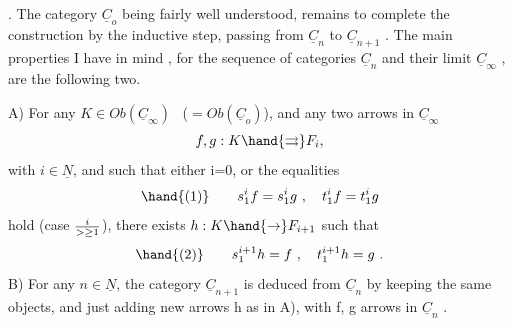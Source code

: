 . The category $\underline{C}_o$ being fairly well understood,  remains to complete
the construction by the inductive step,  passing from $\underline{C}_n$ to $\underline{C}_{n+1}$ . The
main properties I have in mind  , for the sequence of categories
$\underline{C}_n$ and their limit $\underline{C}_\infty$ , are the following two.

A) For any $K\in Ob(\underline{C}_\infty)$ \ ($= Ob(\underline{C}_o)$), and any two arrows in $\underline{C}_\infty$
\[ f,g : K \hand{\rightrightarrows} F_i , \]
with $i\in\underline{N}$, \hand{(}and such that either i=0, or the equalities
\[ \hand{(1)}\qquad s_1^i f = s_1^i g \ , \quad t_1^i f = t_1^i g \]
hold (case $i \over{>}{\geq} 1$), there exists $h: K\hand{\to} F_{i+1}$ such that
\[ \hand{(2)}\qquad s_1^{i+1} h = f \ , \quad t_1^{i+1} h = g \ . \]
B) For any $n\in\underline{N}$, the category $\underline{C}_{n+1}$ is deduced from $\underline{C}_n$ by keeping
the same objects, and just adding new arrows  h as in A), with
f, g arrows in $\underline{C}_n$ .

